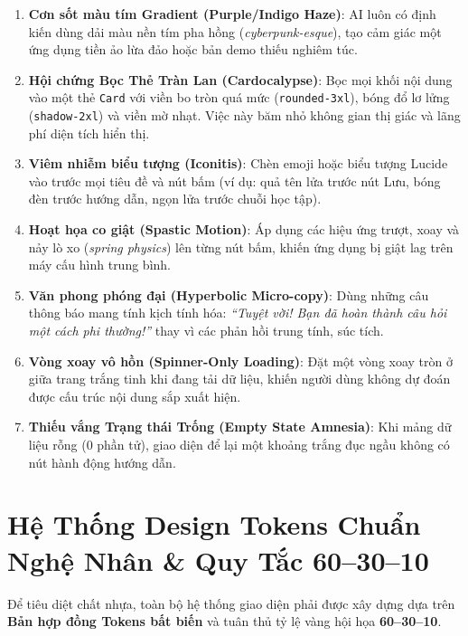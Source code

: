 \documentclass[a4paper,11pt]{article}
\begin{document}
\begin{enumerate}[label={\arabic*.}]
    \item \textbf{Cơn sốt màu tím Gradient (Purple/Indigo Haze)}: AI luôn có định kiến dùng dải màu nền tím pha hồng (\textit{cyberpunk-esque}), tạo cảm giác một ứng dụng tiền ảo lừa đảo hoặc bản demo thiếu nghiêm túc.
    \item \textbf{Hội chứng Bọc Thẻ Tràn Lan (Cardocalypse)}: Bọc mọi khối nội dung vào một thẻ \texttt{Card} với viền bo tròn quá mức (\texttt{rounded-3xl}), bóng đổ lơ lửng (\texttt{shadow-2xl}) và viền mờ nhạt. Việc này băm nhỏ không gian thị giác và lãng phí diện tích hiển thị.
    \item \textbf{Viêm nhiễm biểu tượng (Iconitis)}: Chèn emoji hoặc biểu tượng Lucide vào trước mọi tiêu đề và nút bấm (ví dụ: quả tên lửa trước nút Lưu, bóng đèn trước hướng dẫn, ngọn lửa trước chuỗi học tập).
    \item \textbf{Hoạt họa co giật (Spastic Motion)}: Áp dụng các hiệu ứng trượt, xoay và nảy lò xo (\textit{spring physics}) lên từng nút bấm, khiến ứng dụng bị giật lag trên máy cấu hình trung bình.
    \item \textbf{Văn phong phóng đại (Hyperbolic Micro-copy)}: Dùng những câu thông báo mang tính kịch tính hóa: \textit{``Tuyệt vời! Bạn đã hoàn thành câu hỏi một cách phi thường!''} thay vì các phản hồi trung tính, súc tích.
    \item \textbf{Vòng xoay vô hồn (Spinner-Only Loading)}: Đặt một vòng xoay tròn ở giữa trang trắng tinh khi đang tải dữ liệu, khiến người dùng không dự đoán được cấu trúc nội dung sắp xuất hiện.
    \item \textbf{Thiếu vắng Trạng thái Trống (Empty State Amnesia)}: Khi mảng dữ liệu rỗng ($0$ phần tử), giao diện để lại một khoảng trắng đục ngầu không có nút hành động hướng dẫn.
\end{enumerate}

\section{Hệ Thống Design Tokens Chuẩn Nghệ Nhân \& Quy Tắc 60--30--10}

Để tiêu diệt chất nhựa, toàn bộ hệ thống giao diện phải được xây dựng dựa trên \textbf{Bản hợp đồng Tokens bất biến} và tuân thủ tỷ lệ vàng hội họa \textbf{60--30--10}.
\end{document}
